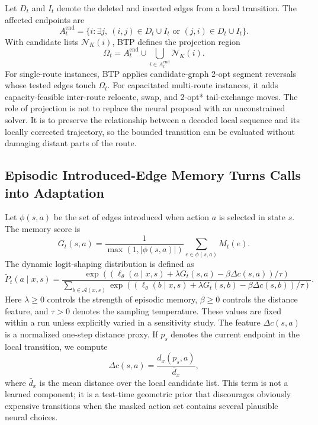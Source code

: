 \documentclass[11pt]{article}
\newcommand{\BTP}{\textsc{BTP}}
\newcommand{\cA}{\mathcal{A}}
\newcommand{\cN}{\mathcal{N}}
\begin{document}
Let $D_t$ and $I_t$ denote the deleted and inserted edges from a local transition. The affected endpoints are
\begin{equation}
  A_t^{\mathrm{end}}=\{i:\exists j,\ (i,j)\in D_t\cup I_t \text{ or } (j,i)\in D_t\cup I_t\}.
  \label{eq:endpoints}
\end{equation}
With candidate lists $\cN_K(i)$, \BTP{} defines the projection region
\begin{equation}
  \Omega_t=A_t^{\mathrm{end}}\cup\bigcup_{i\in A_t^{\mathrm{end}}}\cN_K(i).
  \label{eq:scope}
\end{equation}
For single-route instances, \BTP{} applies candidate-graph 2-opt segment reversals whose tested edges touch $\Omega_t$. For capacitated multi-route instances, it adds capacity-feasible inter-route relocate, swap, and 2-opt* tail-exchange moves. The role of projection is not to replace the neural proposal with an unconstrained solver. It is to preserve the relationship between a decoded local sequence and its locally corrected trajectory, so the bounded transition can be evaluated without damaging distant parts of the route.

\subsection{Episodic Introduced-Edge Memory Turns Calls into Adaptation}

Let $\phi(s,a)$ be the set of edges introduced when action $a$ is selected in state $s$. The memory score is
\begin{equation}
  G_t(s,a)=\frac{1}{\max(1,|\phi(s,a)|)}\sum_{e\in\phi(s,a)}M_t(e).
  \label{eq:memory-score}
\end{equation}
The dynamic logit-shaping distribution is defined as
\begin{equation}
  \widetilde P_t(a\mid x,s)=
  \frac{
  \exp((\ell_\theta(a\mid x,s)+\lambda G_t(s,a)-\beta\Delta c(s,a))/\tau)
  }{
  \sum_{b\in\cA(x,s)}
  \exp((\ell_\theta(b\mid x,s)+\lambda G_t(s,b)-\beta\Delta c(s,b))/\tau)
  }.
  \label{eq:shaped}
\end{equation}
Here $\lambda\ge0$ controls the strength of episodic memory, $\beta\ge0$ controls the distance feature, and $\tau>0$ denotes the sampling temperature. These values are fixed within a run unless explicitly varied in a sensitivity study. The feature $\Delta c(s,a)$ is a normalized one-step distance proxy. If $p_s$ denotes the current endpoint in the local transition, we compute
\begin{equation}
  \Delta c(s,a)=\frac{d_x(p_s,a)}{\bar d_x},
  \label{eq:insertion}
\end{equation}
where $\bar d_x$ is the mean distance over the local candidate list. This term is not a learned component; it is a test-time geometric prior that discourages obviously expensive transitions when the masked action set contains several plausible neural choices.
\end{document}
